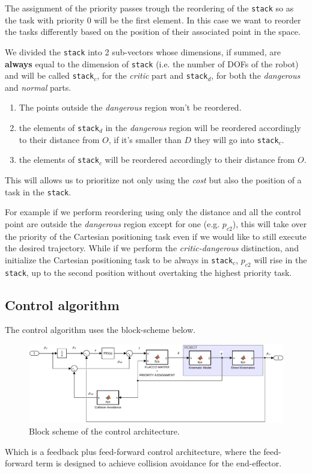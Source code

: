 \documentclass[12pt, a4paper]{article}
\begin{document}
The assignment of the priority passes trough the reordering of the \texttt{stack} so as the task with priority $0$ will be the first element.
In this case we want to reorder the tasks differently based on the position of their associated point in the space.

We divided the \texttt{stack} into 2 sub-vectors whose dimensions, if summed, are \textbf{always} equal to the dimension of \texttt{stack} (i.e. the number of DOFs of the robot) and will be called \texttt{stack$_c$}, for the \emph{critic} part and \texttt{stack$_d$}, for both the \emph{dangerous} and \emph{normal} parts.

\begin{enumerate}
\item The points outside the \emph{dangerous} region won't be reordered.
\item the elements of \texttt{stack$_d$} in the \emph{dangerous} region will be reordered accordingly to their distance from $O$, if it's smaller than $D$ they will go into \texttt{stack$_c$}.
\item the elements of \texttt{stack$_c$} will be reordered accordingly to their distance from $O$.
\end{enumerate}
This will allows us to prioritize not only using the \emph{cost} but also the position of a task in the \texttt{stack}.

For example if we perform reordering using only the distance and all the control point are outside the \emph{dangerous} region except for one (e.g. $p_{c2}$), this will take over the priority of the Cartesian positioning task even if we would like to still execute the desired trajectory. While if we perform the \emph{critic-dangerous} distinction, and initialize the Cartesian positioning task to be always in \texttt{stack$_c$}, $p_{c2}$ will rise in the \texttt{stack}, up to the second position without overtaking the highest priority task.
\subsection{Control algorithm}
The control algorithm uses the block-scheme below.
\begin{figure}[H]
\centering
\includegraphics[width = 1.2\linewidth]{./plots/ControlSchemeModel.pdf}
\caption{Block scheme of the control architecture.}
\end{figure}
Which is a feedback plus feed-forward control architecture, where the feed-forward term is designed to achieve collision avoidance for the end-effector.
\end{document}
